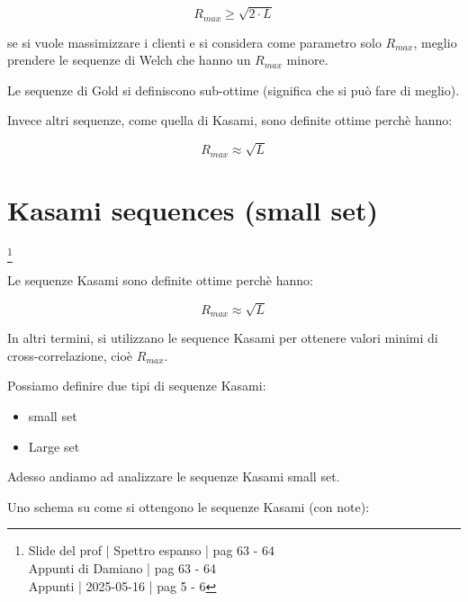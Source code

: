 {
    \Large 
    \begin{equation}
        R_{max} \ge \sqrt{2 \cdot L}
    \end{equation}
}

se si vuole massimizzare i clienti e si considera come parametro solo $R_{max}$, 
meglio prendere le sequenze di Welch che hanno un $R_{max}$ minore. \newline 

Le sequenze di Gold si definiscono sub-ottime (significa che si può fare di meglio). \newline 

Invece altri sequenze, come quella di Kasami, sono definite ottime perchè hanno: 

{
    \Large 
    \begin{equation}
        R_{max}
        \approx
        \sqrt{L}
    \end{equation}
}

\newpage 

\section{Kasami sequences (small set)}
\footnote{Slide del prof | Spettro espanso | pag 63 - 64\\
Appunti di Damiano | pag 63 - 64\\
Appunti | 2025-05-16 | pag 5 - 6
} 

Le sequenze Kasami sono definite ottime perchè hanno: 

{
    \Large 
    \begin{equation}
        R_{max}
        \approx
        \sqrt{L}
    \end{equation}
}

In altri termini, 
si utilizzano le sequence Kasami per ottenere valori minimi di cross-correlazione, 
cioè $R_{max}$. \newline 

Possiamo definire due tipi di sequenze Kasami: 

\begin{itemize}
    \item small set 
    \item Large set
\end{itemize}

Adesso andiamo ad analizzare le sequenze Kasami small set. \newline 

Uno schema su come si ottengono le sequenze Kasami (con note): 

